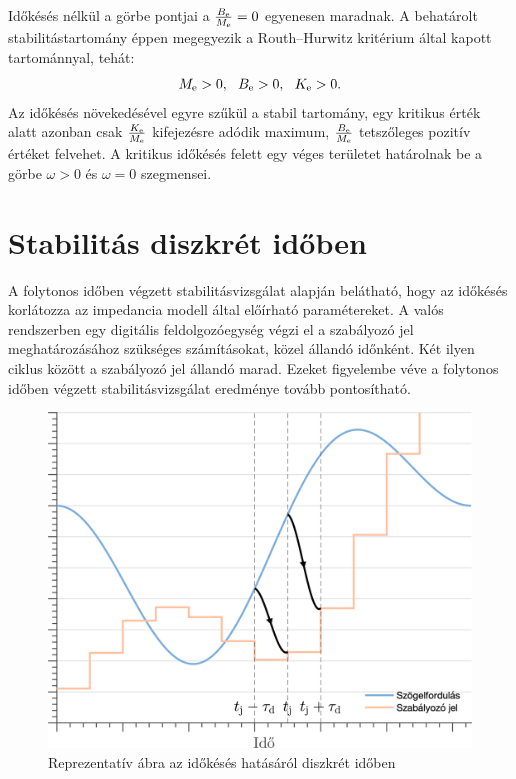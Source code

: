 Időkésés nélkül a görbe pontjai a \(\frac{B_{\mathrm{e}}}{M_{\mathrm{e}}} = 0\) egyenesen maradnak.
A behatárolt stabilitástartomány éppen megegyezik a Routh--Hurwitz kritérium által 
kapott tartománnyal, tehát:
\begin{equation}
    M_{\mathrm{e}} > 0,~~B_{\mathrm{e}} > 0,~~K_{\mathrm{e}} > 0.
\end{equation}
Az időkésés növekedésével egyre szűkül a stabil tartomány, egy kritikus érték alatt azonban
csak \(\frac{K_{\mathrm{e}}}{M_{\mathrm{e}}}\) kifejezésre adódik maximum, \(\frac{B_{\mathrm{e}}}{M_{\mathrm{e}}}\)
tetszőleges pozitív értéket felvehet. A kritikus időkésés felett egy véges területet határolnak be 
a görbe \(\omega > 0\) és \(\omega = 0\) szegmensei. 

\section{Stabilitás diszkrét időben}
A folytonos időben végzett stabilitásvizsgálat alapján belátható, hogy az 
időkésés korlátozza az impedancia modell által előírható paramétereket.
A valós rendszerben egy digitális feldolgozóegység végzi el a szabályozó jel
meghatározásához szükséges számításokat, közel állandó időnként. Két ilyen 
ciklus között a szabályozó jel állandó marad. Ezeket figyelembe véve a 
folytonos időben végzett stabilitásvizsgálat eredménye tovább pontosítható.
\begin{figure}[ht]
    \begin{center}
    \includegraphics[width=12cm]{images/time_delay_example_discrete.png}
    \caption{Reprezentatív ábra az időkésés hatásáról diszkrét időben}\label{fig:time_delay_example_discrete}
    \end{center}
\end{figure}

